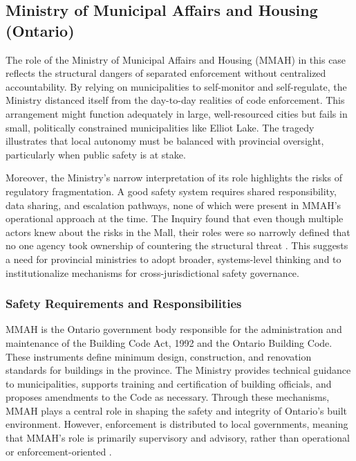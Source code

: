 \documentclass[12pt]{article}
\begin{document}
\subsection{Ministry of Municipal Affairs and Housing (Ontario)}

The role of the Ministry of Municipal Affairs and Housing (MMAH) in this case reflects the structural dangers of separated enforcement without centralized accountability. By relying on municipalities to self-monitor and self-regulate, the Ministry distanced itself from the day-to-day realities of code enforcement. This arrangement might function adequately in large, well-resourced cities but fails in small, politically constrained municipalities like Elliot Lake. The tragedy illustrates that local autonomy must be balanced with provincial oversight, particularly when public safety is at stake.

Moreover, the Ministry's narrow interpretation of its role highlights the risks of regulatory fragmentation. A good safety system requires shared responsibility, data sharing, and escalation pathways, none of which were present in MMAH's operational approach at the time. The Inquiry found that even though multiple actors knew about the risks in the Mall, their roles were so narrowly defined that no one agency took ownership of countering the structural threat \cite[p405-407]{AlgoLakeReport1}. This suggests a need for provincial ministries to adopt broader, systems-level thinking and to institutionalize mechanisms for cross-jurisdictional safety governance.

\subsubsection*{Safety Requirements and Responsibilities}

MMAH is the Ontario government body responsible for the administration and maintenance of the Building Code Act, 1992 and the Ontario Building Code. These instruments define minimum design, construction, and renovation standards for buildings in the province. The Ministry provides technical guidance to municipalities, supports training and certification of building officials, and proposes amendments to the Code as necessary. Through these mechanisms, MMAH plays a central role in shaping the safety and integrity of Ontario's built environment. However, enforcement is distributed to local governments, meaning that MMAH's role is primarily supervisory and advisory, rather than operational or enforcement-oriented \cite[p2-3, p405-406]{AlgoLakeReport1}.
\end{document}
